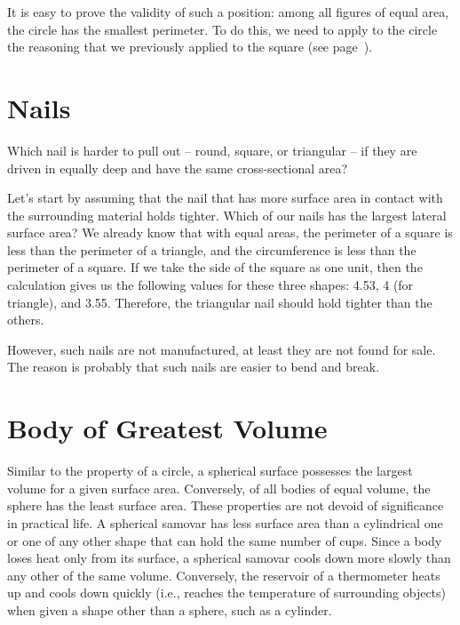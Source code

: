 It is easy to prove the validity of such a position: among all figures of equal area, the circle has the smallest perimeter. To do this, we need to apply to the circle the reasoning that we previously applied to the square (see page~\pageref{sec-12.4}).

\section{Nails}
\label{sec-12.7}

\ques Which nail is harder to pull out -- round, square, or triangular -- if they are driven in equally deep and have the same cross-sectional area?

\ans Let's start by assuming that the nail that has more surface area in contact with the surrounding material holds tighter. Which of our nails has the largest lateral surface area? We already know that with equal areas, the perimeter of a square is less than the perimeter of a triangle, and the circumference is less than the perimeter of a square. If we take the side of the square as one unit, then the calculation gives us the following values for these three shapes: 4.53, 4 (for triangle), and 3.55. Therefore, the triangular nail should hold tighter than the others.

However, such nails are not manufactured, at least they are not found for sale. The reason is probably that such nails are easier to bend and break.


\section{Body of Greatest Volume}
\label{sec-12.8}

Similar to the property of a circle, a spherical surface possesses the largest volume for a given surface area. Conversely, of all bodies of equal volume, the sphere has the least surface area. These properties are not devoid of significance in practical life. A spherical samovar has less surface area than a cylindrical one or one of any other shape that can hold the same number of cups. Since a body loses heat only from its surface, a spherical samovar cools down more slowly than any other of the same volume. Conversely, the reservoir of a thermometer heats up and cools down quickly (i.e., reaches the temperature of surrounding objects) when given a shape other than a sphere, such as a cylinder.

